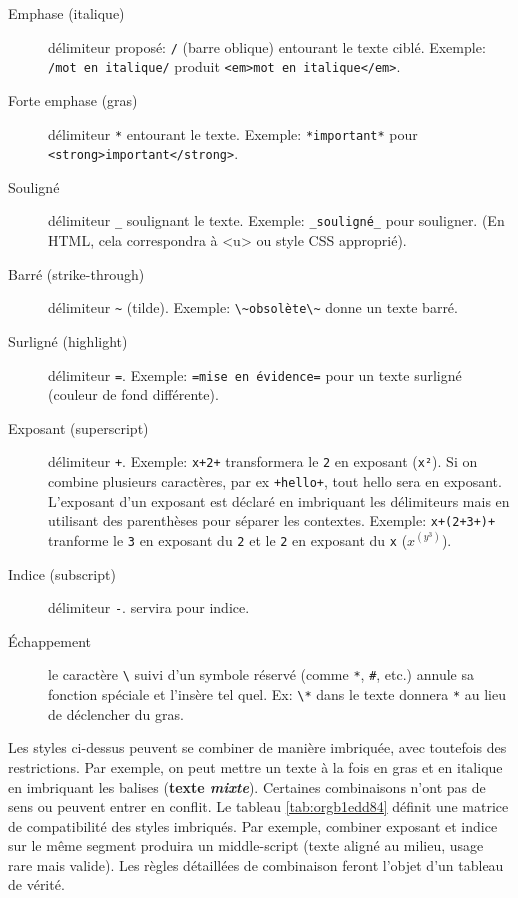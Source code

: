 \documentclass[a4paper,12pt]{article}
\begin{document}
\begin{description}
\item[{Emphase (italique)}] délimiteur proposé: \texttt{/} (barre oblique) entourant le texte ciblé. Exemple: \texttt{/mot en italique/} produit \texttt{<em>mot en italique</em>}.
\item[{Forte emphase (gras)}] délimiteur \texttt{*} entourant le texte. Exemple: \texttt{*important*} pour \texttt{<strong>important</strong>}.
\item[{Souligné}] délimiteur \texttt{\_} soulignant le texte. Exemple: \texttt{\_souligné\_} pour souligner. (En HTML, cela correspondra à <u> ou style CSS approprié).
\item[{Barré (strike-through)}] délimiteur \texttt{\textasciitilde{}} (tilde). Exemple: \texttt{\textbackslash{}\textasciitilde{}obsolète\textbackslash{}\textasciitilde{}} donne un texte barré.
\item[{Surligné (highlight)}] délimiteur \texttt{=}. Exemple: \texttt{=mise en évidence=} pour un texte surligné (couleur de fond différente).
\item[{Exposant (superscript)}] délimiteur \texttt{+}. Exemple: \texttt{x+2+} transformera le \texttt{2} en exposant (\texttt{x²}). Si on combine plusieurs caractères, par ex \texttt{+hello+}, tout hello sera en exposant. L'exposant d'un exposant est déclaré en imbriquant les délimiteurs mais en utilisant des parenthèses pour séparer les contextes. Exemple: \texttt{x+(2+3+)+} tranforme le \texttt{3} en exposant du \texttt{2} et le \texttt{2} en exposant du \texttt{x} (\(x^{(y^{3})}\)).
\item[{Indice (subscript)}] délimiteur \texttt{-}. servira pour indice.
\item[{Échappement}] le caractère \texttt{\textbackslash{}} suivi d’un symbole réservé (comme \texttt{*}, \texttt{\#}, etc.) annule sa fonction spéciale et l’insère tel quel. Ex: \texttt{\textbackslash{}*} dans le texte donnera \texttt{*} au lieu de déclencher du gras.
\end{description}

Les styles ci-dessus peuvent se combiner de manière imbriquée, avec toutefois des restrictions. Par exemple, on peut mettre un texte à la fois en gras et en italique en imbriquant les balises (\textbf{texte \emph{mixte}}). Certaines combinaisons n’ont pas de sens ou peuvent entrer en conflit. Le tableau \ref{tab:orgb1edd84} définit une matrice de compatibilité des styles imbriqués. Par exemple, combiner exposant et indice sur le même segment produira un middle-script (texte aligné au milieu, usage rare mais valide). Les règles détaillées de combinaison feront l’objet d’un tableau de vérité.
\end{document}
